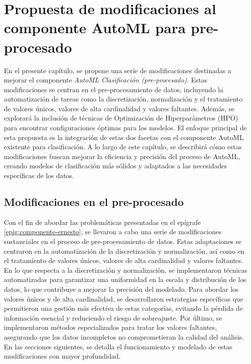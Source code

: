 \chapter{Propuesta de modificaciones al componente AutoML para pre-procesado}\label{chap:2}
En el presente capítulo, se propone una serie de modificaciones destinadas a mejorar el componente \emph{AutoML Clasificación (pre-procesado)}. Estas modificaciones se centran en el pre-procesamiento de datos, incluyendo la automatización de tareas como la discretización, normalización y el tratamiento de valores únicos, valores de alta cardinalidad y valores faltantes. Además, se explorará la inclusión de técnicas de Optimización de Hiperparámetros (HPO) para encontrar configuraciones óptimas para los modelos. El enfoque principal de esta propuesta es la integración de estas dos facetas con el componente AutoML existente para clasificación. A lo largo de este capítulo, se describirá cómo estas modificaciones buscan mejorar la eficiencia y precisión del proceso de AutoML, creando modelos de clasificación más sólidos y adaptados a las necesidades específicas de los datos.

\section{Modificaciones en el pre-procesado}
Con el fin de abordar las problemáticas presentadas en el epígrafe \ref{epig:componente-ernesto}, se llevaron a cabo una serie de modificaciones sustanciales en el proceso de pre-procesamiento de datos. Estas adaptaciones se centraron en la automatización de la discretización y normalización, así como en el tratamiento de valores únicos, valores de alta cardinalidad y valores faltantes. En lo que respecta a la discretización y normalización, se implementaron técnicas automatizadas para garantizar una uniformidad en la escala y distribución de los datos, lo que contribuye a mejorar la precisión del modelado. Para abordar los valores únicos y de alta cardinalidad, se desarrollaron estrategias específicas que permitieron una gestión más efectiva de estas categorías, evitando la pérdida de información esencial y reduciendo el riesgo de sobreajuste. Por último, se implementaron métodos especializados para tratar los valores faltantes, asegurando que los datos incompletos no comprometieran la calidad del análisis. En las secciones siguientes, se detalla el funcionamiento y modelado de estas modificaciones con mayor profundidad.


